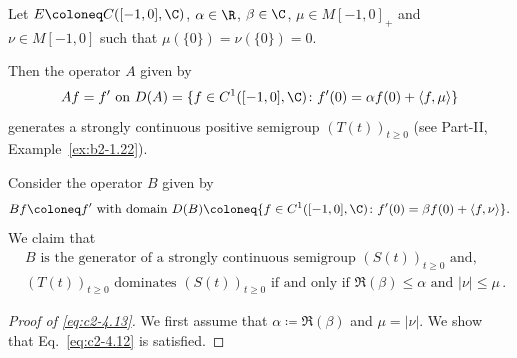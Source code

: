 \begin{example}\label{ex:c2-4.14}
Let $E \coloneq C([-1,0],\C)$, $\alpha \in \R$, $\beta \in \C$, $\mu \in M[-1,0]_{+}$
and $\nu \in M[-1,0]$ such that $\mu(\{0\}) = \nu(\{0\}) = 0$.

Then the operator $A$ given by 
\[
Af = f' \text{ on } D(A) = \{f \in C^{1}([-1,0],\C) \colon f'(0) = \alpha f(0) + \langle f,\mu\rangle\}
\]
generates a strongly continuous positive semigroup $(T(t))_{t \geq 0}$ 
(see Part-II, Example~\ref{ex:b2-1.22}).

Consider the operator $B$ given by
\[Bf \coloneq f' \text{ with domain } D(B) \coloneq \{f \in C^{1}([-1,0],\C) \colon f'(0) = \beta f(0) + \langle f,\nu \rangle\}.
\]
We claim that
\begin{equation}\label{eq:c2-4.13}
\begin{split}
& B  \text{ is the generator of a strongly continuous semigroup } (S(t))_{t \geq 0}  
\text{ and, } \\ 
&(T(t))_{t \geq 0} \text{ dominates } (S(t))_{t \geq 0} 
\text{ if and only if } \Re(\beta) \leq \alpha \text{ and } |\nu| \leq \mu\,.
\end{split} 
\end{equation}
\begin{proof}[Proof of \eqref{eq:c2-4.13}]
We first assume that $\alpha \coloneqq \Re(\beta)$ and $\mu = |\nu|$.
We show that Eq.~\eqref{eq:c2-4.12} is satisfied.


\end{proof}
\end{example}
